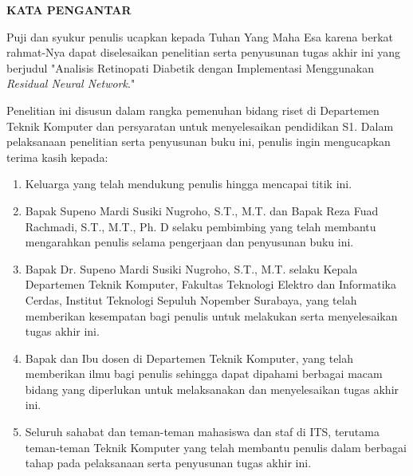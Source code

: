 \begin{center}
  \Large
  \textbf{KATA PENGANTAR}
\end{center}


\vspace{2ex}


Puji dan syukur penulis ucapkan kepada Tuhan Yang Maha Esa karena berkat rahmat-Nya dapat diselesaikan penelitian serta penyusunan tugas akhir ini yang berjudul "Analisis Retinopati Diabetik dengan Implementasi Menggunakan \emph{Residual Neural Network}."

Penelitian ini disusun dalam rangka pemenuhan bidang riset di Departemen Teknik Komputer dan persyaratan untuk menyelesaikan pendidikan S1. Dalam pelaksanaan penelitian serta penyusunan buku ini, penulis ingin mengucapkan terima kasih kepada:

\begin{enumerate}[nolistsep]

  \item Keluarga yang telah mendukung penulis hingga mencapai titik ini.

  \item Bapak Supeno Mardi Susiki Nugroho, S.T., M.T. dan Bapak Reza Fuad Rachmadi, S.T., M.T., Ph. D selaku pembimbing yang telah membantu mengarahkan penulis selama pengerjaan dan penyusunan buku ini. 

  \item Bapak Dr. Supeno Mardi Susiki Nugroho, S.T., M.T. selaku Kepala Departemen Teknik Komputer, Fakultas Teknologi Elektro dan Informatika Cerdas, Institut Teknologi Sepuluh Nopember Surabaya, yang telah memberikan kesempatan bagi penulis untuk melakukan serta menyelesaikan tugas akhir ini.
  
  \item Bapak dan Ibu dosen di Departemen Teknik Komputer, yang telah memberikan ilmu bagi penulis sehingga dapat dipahami berbagai macam bidang yang diperlukan untuk melaksanakan dan menyelesaikan tugas akhir ini.

  \item Seluruh sahabat dan teman-teman mahasiswa dan staf di ITS, terutama teman-teman Teknik Komputer yang telah membantu penulis dalam berbagai tahap pada pelaksanaan serta penyusunan tugas akhir ini.

\end{enumerate}

